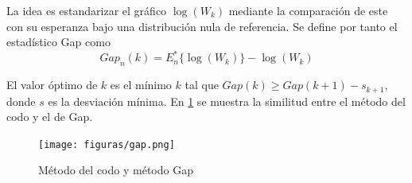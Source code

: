 La idea es estandarizar el gráfico $\log{(W_k)}$ mediante la comparación de este con su esperanza bajo una distribución nula de referencia. Se define por tanto el estadístico Gap como
\begin{equation}
Gap_n(k) = E_n^*\{\log{(W_k)}\} - \log{(W_k)} \nonumber
\end{equation}

El valor óptimo de $k$ es el mínimo $k$ tal que $Gap(k) \geq Gap(k+1) - s_{k+1}$, donde $s$ es la desviación mínima. En \ref{fig_gap} se muestra la similitud entre el método del codo y el de Gap. \\

\begin{figure}[ht!]
\begin{center}
\texttt{[image: figuras/gap.png]}
\end{center}
\caption{Método del codo y método Gap}
\label{fig_gap}
\end{figure}
